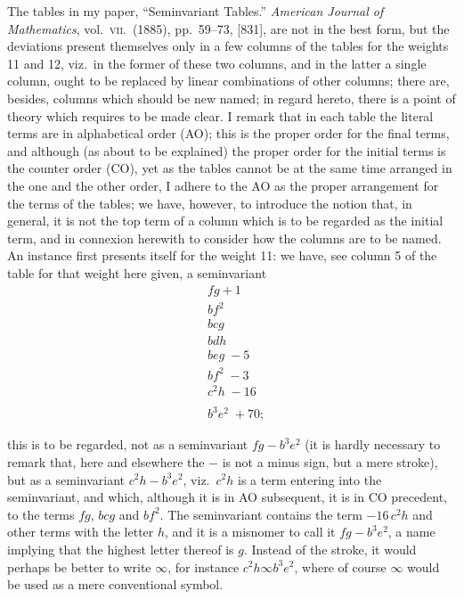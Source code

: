 \documentclass[11pt,a4paper]{article}
\begin{document}
The tables in my paper, ``Seminvariant Tables.'' \textit{American Journal of Mathematics}, vol.\ \textsc{vii}.\ (1885), pp.\ 59--73, [831], are not in the best form, but the deviations present themselves only in a few columns of the tables for the weights 11 and 12, viz.\ in the former of these two columns, and in the latter a single column, ought to be replaced by linear combinations of other columns; there are, besides, columns which should be new named; in regard hereto, there is a point of theory which requires to be made clear. I remark that in each table the literal terms are in alphabetical order (AO); this is the proper order for the final terms, and although (as about to be explained) the proper order for the initial terms is the counter order (CO), yet as the tables cannot be at the same time arranged in the one and the other order, I adhere to the AO as the proper arrangement for the terms of the tables; we have, however, to introduce the notion that, in general, it is not the top term of a column which is to be regarded as the initial term, and in connexion herewith to consider how the columns are to be named. An instance first presents itself for the weight 11: we have, see column 5 of the table for that weight here given, a seminvariant
\[
\begin{array}{rl}
& fg + 1 \\
& bf^2 \\
& bcg \\
& bdh \\
& beg\; - 5 \\
& b f^2\; -3 \\
& c^2 h\; - 16 \\
& \\
& b^3 e^2 \;+ 70;
\end{array}
\]

this is to be regarded, not as a seminvariant $fg - b^3 e^2$ (it is hardly necessary to remark that, here and elsewhere the $-$ is not a minus sign, but a mere stroke), but as a seminvariant $c^2 h - b^3 e^2$, viz.\ $c^2 h$ is a term entering into the seminvariant, and which, although it is in AO subsequent, it is in CO precedent, to the terms $fg$, $bcg$ and $bf^2$. The seminvariant contains the term $-16\,c^2 h$ and other terms with the letter $h$, and it is a misnomer to call it $fg - b^3 e^2$, a name implying that the highest letter thereof is $g$. Instead of the stroke, it would perhaps be better to write $\infty$, for instance $c^2 h \infty b^3 e^2$, where of course $\infty$ would be used as a mere conventional symbol.
\end{document}
